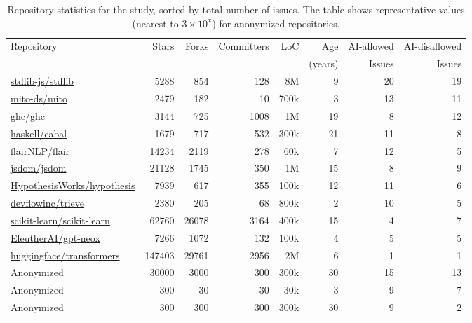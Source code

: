 \begin{table}[htbp]
\centering \small
\begin{tabular}{p{3cm}rrrrrrr}
\toprule
Repository & Stars & Forks & Committers & LoC & Age & AI-allowed & AI-disallowed \\
 &  &  &  &  & (years) & Issues & Issues \\
\midrule
\href{https://github.com/stdlib-js/stdlib}{stdlib-js/stdlib} & 5288 & 854 & 128 & 8M & 9 & 20 & 19 \\
\href{https://github.com/mito-ds/mito}{mito-ds/mito} & 2479 & 182 & 10 & 700k & 3 & 13 & 11 \\
\href{https://github.com/ghc/ghc}{ghc/ghc} & 3144 & 725 & 1008 & 1M & 19 & 8 & 12 \\
\href{https://github.com/haskell/cabal}{haskell/cabal} & 1679 & 717 & 532 & 300k & 21 & 11 & 8 \\
\href{https://github.com/flairNLP/flair}{flairNLP/flair} & 14234 & 2119 & 278 & 60k & 7 & 12 & 5 \\
\href{https://github.com/jsdom/jsdom}{jsdom/jsdom} & 21128 & 1745 & 350 & 1M & 15 & 8 & 9 \\
\href{https://github.com/HypothesisWorks/hypothesis}{HypothesisWorks/hypothesis} & 7939 & 617 & 355 & 100k & 12 & 11 & 6 \\
\href{https://github.com/devflowinc/trieve}{devflowinc/trieve} & 2380 & 205 & 68 & 800k & 2 & 10 & 5 \\
\href{https://github.com/scikit-learn/scikit-learn}{scikit-learn/scikit-learn} & 62760 & 26078 & 3164 & 400k & 15 & 4 & 7 \\
\href{https://github.com/EleutherAI/gpt-neox}{EleutherAI/gpt-neox} & 7266 & 1072 & 132 & 100k & 4 & 5 & 5 \\
\href{https://github.com/huggingface/transformers}{huggingface/transformers} & 147403 & 29761 & 2956 & 2M & 6 & 1 & 1 \\
Anonymized & 30000 & 3000 & 300 & 300k & 30 & 15 & 13 \\
Anonymized & 300 & 30 & 30 & 30k & 3 & 9 & 7 \\
Anonymized & 300 & 300 & 300 & 300k & 30 & 9 & 2 \\
\bottomrule
\end{tabular}
\caption{Repository statistics for the study, sorted by total number of issues. The table shows representative values (nearest to $3 \times 10^x$) for anonymized repositories.}
\label{tab:repo_stats}
\end{table}
